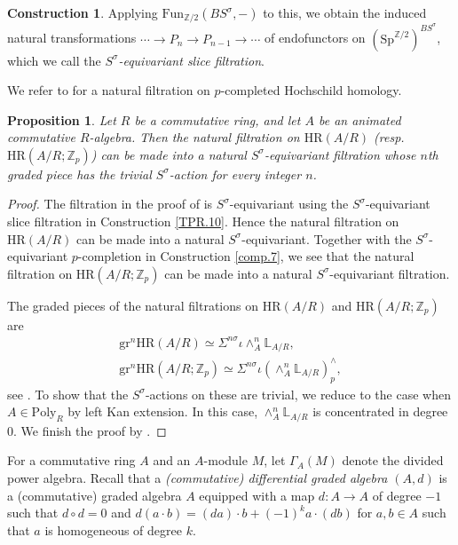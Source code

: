 \documentclass[10pt]{amsart}
\newtheorem{prop}[thm]{Proposition}
\theoremstyle{definition}
\newtheorem{const}[thm]{Construction}
\numberwithin{equation}{section}
\renewcommand{\L}{\mathbb{L}}
\newcommand{\Z}{\mathbb{Z}}
\newcommand{\Fun}{\mathrm{Fun}}
\newcommand{\Sp}{\mathrm{Sp}}
\newcommand{\Poly}{\mathrm{Poly}}
\newcommand{\gr}{\mathrm{gr}}
\newcommand{\HR}{\mathrm{HR}}
\begin{document}
{\begin{const}
Applying $\Fun_{\Z/2}(BS^\sigma,-)$ to this,
we obtain the induced natural transformations
\(
\cdots \to P_n\to P_{n-1}\to \cdots
\)
of endofunctors on $(\Sp^{\Z/2})^{BS^\sigma}$,
which we call the \emph{$S^\sigma$-equivariant slice filtration}.
\end{const}

We refer to \cite[Corollary 4.39]{HP23} for a natural filtration on $p$-completed Hochschild homology.

\begin{prop}
\label{TPR.11}
Let $R$ be a commutative ring,
and let $A$ be an animated commutative $R$-algebra.
Then the natural filtration on $\HR(A/R)$ (resp.\ $\HR(A/R;\Z_p)$) can be made into a natural $S^\sigma$-equivariant filtration whose $n$th graded piece has the trivial $S^\sigma$-action for every integer $n$.
\end{prop}
\begin{proof}
The filtration in the proof of \cite[Lemma 4.27]{HP} is $S^\sigma$-equivariant using the $S^\sigma$-equivariant slice filtration in Construction \ref{TPR.10}.
Hence the natural filtration on $\HR(A/R)$ can be made into a natural $S^\sigma$-equivariant.
Together with the $S^\sigma$-equivariant $p$-completion in Construction \ref{comp.7},
we see that the natural filtration on $\HR(A/R;\Z_p)$ can be made into a natural $S^\sigma$-equivariant filtration.

The graded pieces of the natural filtrations on $\HR(A/R)$ and $\HR(A/R;\Z_p)$ are
\begin{gather*}
\gr^n \HR(A/R)
\simeq
\Sigma^{n\sigma}\iota \wedge_A^n \L_{A/R},
\\
\gr^n \HR(A/R;\Z_p)
\simeq
\Sigma^{n\sigma} \iota (\wedge_A^n \L_{A/R})_p^\wedge,
\end{gather*}
see \cite[Theorem 4.32, Corollary 4.40]{HP}.
To show that the $S^\sigma$-actions on these are trivial,
we reduce to the case when $A\in \Poly_R$ by left Kan extension.
In this case,
$\wedge_A^n \L_{A/R}$ is concentrated in degree $0$.
We finish the proof by \cite[Proposition 6.10]{QS22}.
\end{proof}

For a commutative ring $A$ and an $A$-module $M$,
let $\Gamma_A (M)$ denote the divided power algebra.
Recall that a \emph{(commutative) differential graded algebra $(A,d)$} is a (commutative) graded algebra $A$ equipped with a map $d\colon A\to A$ of degree $-1$ such that $d\circ d=0$ and $d(a\cdot b)=(da)\cdot b +(-1)^k a\cdot (db)$ for $a,b\in A$ such that $a$ is homogeneous of degree $k$.

}
\end{document}

